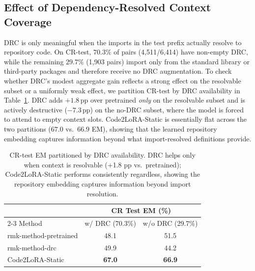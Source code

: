 \documentclass[11pt]{article}
\newcommand{\UseMacro}[1]{\csname rmk-#1\endcsname}
\newcommand{\codelora}{Code2LoRA\xspace}
\newcommand{\codelorastatic}{\codelora-Static\xspace}
\begin{document}
\subsection{Effect of Dependency-Resolved Context Coverage}
\label{app:oracle_coverage}

DRC is only meaningful when the imports in the test prefix actually resolve to repository code.
On CR-test, $70.3\%$ of pairs (4{,}511/6{,}414) have non-empty DRC, while the remaining $29.7\%$ (1{,}903 pairs) import only from the standard library or third-party packages and therefore receive no DRC augmentation.
To check whether DRC's modest aggregate gain reflects a strong effect on the resolvable subset or a uniformly weak effect, we partition CR-test by DRC availability in Table~\ref{tab:oracle_coverage}.
DRC adds $+1.8$\,pp over pretrained \emph{only} on the resolvable subset and is actively destructive ($-7.3$\,pp) on the no-DRC subset, where the model is forced to attend to empty context slots.
\codelorastatic{} is essentially flat across the two partitions ($67.0$ vs.\ $66.9$ EM), showing that the learned repository embedding captures information beyond what import-resolved definitions provide.

\begin{table}[t]
\begin{small}
\begin{center}
\caption{CR-test EM partitioned by DRC availability. DRC helps only when context is resolvable (+1.8 pp vs.\ pretrained); \codelorastatic{} performs consistently regardless, showing the repository embedding captures information beyond import resolution.}\label{tab:oracle_coverage}




{
\setlength{\tabcolsep}{4pt}
\small

\begin{tabular}{@{}lcc@{}}
\toprule
& \multicolumn{2}{c}{CR Test EM (\%)} \\
\cmidrule(lr){2-3}
Method & w/ DRC (70.3\%) & w/o DRC (29.7\%) \\
\midrule
\UseMacro{method-pretrained} & 48.1 & 51.5 \\
\UseMacro{method-drc} & 49.9 & 44.2 \\
\codelorastatic{} & \textbf{67.0} & \textbf{66.9} \\
\bottomrule
\end{tabular}
}

\end{center}
\end{small}
\end{table}
\end{document}
